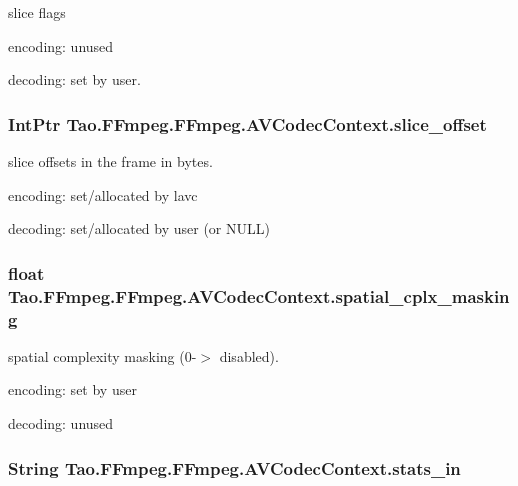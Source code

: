 \label{struct_tao_1_1_f_fmpeg_1_1_f_fmpeg_1_1_a_v_codec_context_ac9d4fe45215140685c69b52c44757704}
slice flags
\begin{DoxyItemize}
\item encoding: unused
\item decoding: set by user. 
\end{DoxyItemize}\hypertarget{struct_tao_1_1_f_fmpeg_1_1_f_fmpeg_1_1_a_v_codec_context_a4061bba691eaeb74e41b45586118a004}{
\subsubsection[{slice\_\-offset}]{\setlength{\rightskip}{0pt plus 5cm}IntPtr {\bf Tao.FFmpeg.FFmpeg.AVCodecContext.slice\_\-offset}}}
\label{struct_tao_1_1_f_fmpeg_1_1_f_fmpeg_1_1_a_v_codec_context_a4061bba691eaeb74e41b45586118a004}
slice offsets in the frame in bytes.
\begin{DoxyItemize}
\item encoding: set/allocated by lavc
\item decoding: set/allocated by user (or NULL) 
\end{DoxyItemize}\hypertarget{struct_tao_1_1_f_fmpeg_1_1_f_fmpeg_1_1_a_v_codec_context_a33185321e98df9e22fd3b99e9648fdb9}{
\subsubsection[{spatial\_\-cplx\_\-masking}]{\setlength{\rightskip}{0pt plus 5cm}float {\bf Tao.FFmpeg.FFmpeg.AVCodecContext.spatial\_\-cplx\_\-masking}}}
\label{struct_tao_1_1_f_fmpeg_1_1_f_fmpeg_1_1_a_v_codec_context_a33185321e98df9e22fd3b99e9648fdb9}
spatial complexity masking (0-\/$>$ disabled).
\begin{DoxyItemize}
\item encoding: set by user
\item decoding: unused 
\end{DoxyItemize}\hypertarget{struct_tao_1_1_f_fmpeg_1_1_f_fmpeg_1_1_a_v_codec_context_aaf9de8090723cecdf642165d7a1ac6fe}{
\subsubsection[{stats\_\-in}]{\setlength{\rightskip}{0pt plus 5cm}String {\bf Tao.FFmpeg.FFmpeg.AVCodecContext.stats\_\-in}}}
